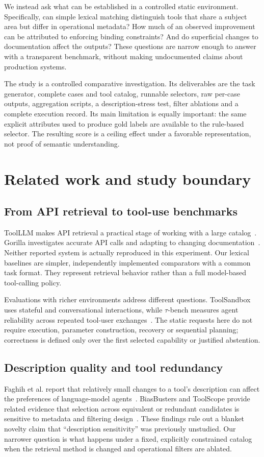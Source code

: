 \documentclass[10pt,a4paper]{article}
\begin{document}
We instead ask what can be established in a controlled static environment. Specifically, can simple lexical matching distinguish tools that share a subject area but differ in operational metadata? How much of an observed improvement can be attributed to enforcing binding constraints? And do superficial changes to documentation affect the outputs? These questions are narrow enough to answer with a transparent benchmark, without making undocumented claims about production systems.

The study is a controlled comparative investigation. Its deliverables are the task generator, complete cases and tool catalog, runnable selectors, raw per-case outputs, aggregation scripts, a description-stress test, filter ablations and a complete execution record. Its main limitation is equally important: the same explicit attributes used to produce gold labels are available to the rule-based selector. The resulting score is a ceiling effect under a favorable representation, not proof of semantic understanding.

\section{Related work and study boundary}
\subsection{From API retrieval to tool-use benchmarks}
ToolLLM makes API retrieval a practical stage of working with a large catalog~\cite{qin2024toolllm}. Gorilla investigates accurate API calls and adapting to changing documentation~\cite{patil2023gorilla}. Neither reported system is actually reproduced in this experiment. Our lexical baselines are simpler, independently implemented comparators with a common task format. They represent retrieval behavior rather than a full model-based tool-calling policy.

Evaluations with richer environments address different questions. ToolSandbox uses stateful and conversational interactions, while $\tau$-bench measures agent reliability across repeated tool-user exchanges~\cite{lu2025toolsandbox,yao2024taubench}. The static requests here do not require execution, parameter construction, recovery or sequential planning; correctness is defined only over the first selected capability or justified abstention.

\subsection{Description quality and tool redundancy}
Faghih et al. report that relatively small changes to a tool's description can affect the preferences of language-model agents~\cite{faghih2025toolpreferences}. BiasBusters and ToolScope provide related evidence that selection across equivalent or redundant candidates is sensitive to metadata and filtering design~\cite{blankenstein2026biasbusters,liu2026toolscope}. These findings rule out a blanket novelty claim that ``description sensitivity'' was previously unstudied. Our narrower question is what happens under a fixed, explicitly constrained catalog when the retrieval method is changed and operational filters are ablated.
\end{document}
